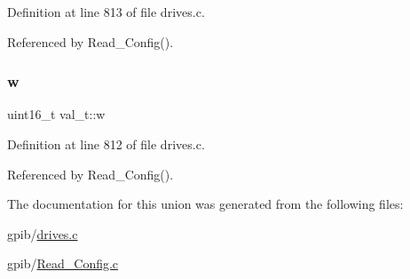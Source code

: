 Definition at line 813 of file drives.\+c.



Referenced by Read\+\_\+\+Config().

\mbox{\label{unionval__t_a35ceb0f111824a2835370671131c38c0}} 
\subsubsection{\texorpdfstring{w}{w}}
{\footnotesize\ttfamily uint16\+\_\+t val\+\_\+t\+::w}



Definition at line 812 of file drives.\+c.



Referenced by Read\+\_\+\+Config().



The documentation for this union was generated from the following files\+:\begin{DoxyCompactItemize}
\item 
gpib/\hyperlink{drives_8c}{drives.\+c}\item 
gpib/\hyperlink{Read__Config_8c}{Read\+\_\+\+Config.\+c}\end{DoxyCompactItemize}
